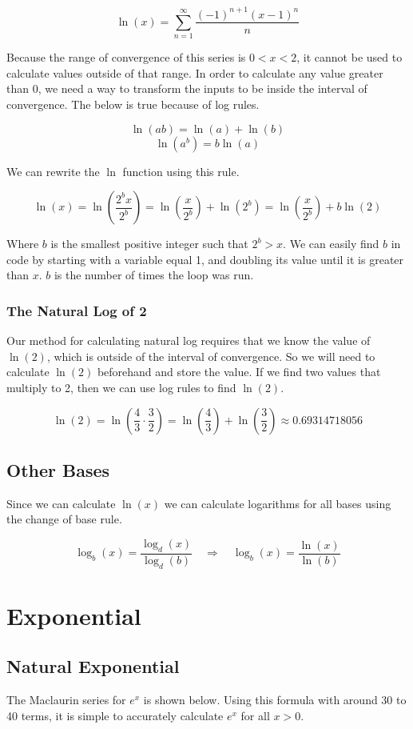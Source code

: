 \documentclass[12pt, letterpaper]{article}
\begin{document}
\[ \ln(x) = \sum_{n=1}^{\infty}\frac{\left(-1\right)^{n+1}\left(x-1\right)^{n}}{n} \]

Because the range of convergence of this series is $0<x<2$, it cannot be used to calculate values outside of that range. In order to calculate any value greater than 0, we need a way to transform the inputs to be inside the interval of convergence. The below is true because of log rules.

\[ \ln(ab) = \ln(a) + \ln(b) \]
\[ \ln(a^b) = b\ln(a) \]

We can rewrite the $\ln$ function using this rule.

\[ \ln(x) = \ln\left(\frac{2^bx}{2^b}\right) = \ln\left(\frac{x}{2^b}\right) + \ln\left(2^b\right) = \ln\left(\frac{x}{2^b}\right) + b\ln\left(2\right) \]

Where $b$ is the smallest positive integer such that $2^b>x$. We can easily find $b$ in code by starting with a variable equal 1, and doubling its value until it is greater than $x$. $b$ is the number of times the loop was run.

\subsubsection{The Natural Log of 2}
Our method for calculating natural log requires that we know the value of $\ln(2)$, which is outside of the interval of convergence. So we will need to calculate $\ln(2)$ beforehand and store the value. If we find two values that multiply to 2, then we can use log rules to find $\ln(2)$.

\[ \ln(2) = \ln\left(\frac{4}{3} \cdot \frac{3}{2}\right) = \ln\left(\frac{4}{3}\right) + \ln\left(\frac{3}{2}\right) \approx 0.69314718056 \]

\subsection{Other Bases}
Since we can calculate $\ln(x)$ we can calculate logarithms for all bases using the change of base rule.

\[ \log_b(x) = \frac{\log_d(x)}{\log_d(b)} \quad \Rightarrow \quad \log_b(x) = \frac{\ln(x)}{\ln(b)} \]

\section{Exponential}
\subsection{Natural Exponential}
The Maclaurin series for $e^x$ is shown below. Using this formula with around 30 to 40 terms, it is simple to accurately calculate $e^x$ for all $x>0$.
\end{document}
